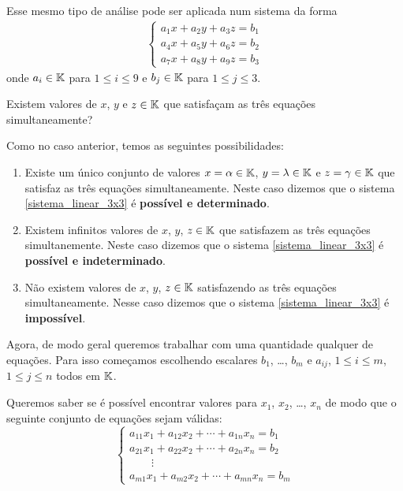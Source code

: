 Esse mesmo tipo de análise pode ser aplicada num sistema da forma
\begin{align}
    \begin{cases}\label{sistema_linear_3x3}
        a_1x + a_2y + a_3z = b_1\\
        a_4x + a_5y + a_6z = b_2\\
        a_7x + a_8y + a_9z = b_3
    \end{cases}
\end{align}
onde $a_i \in \mathbb{K}$ para $1 \le i \le 9$ e $b_j \in \mathbb{K}$ para $1 \le j \le 3$.

\vspace{.3cm}

Existem valores de $x$, $y$ e $z \in \mathbb{K}$ que satisfaçam as três equações simultaneamente?

Como no caso anterior, temos as seguintes possibilidades:
\begin{enumerate}[label={\roman*})]
    \item Existe um único conjunto de valores $x = \alpha \in \mathbb{K}$, $y = \lambda \in \mathbb{K}$ e $z = \gamma \in \mathbb{K}$  que satisfaz as três equações simultaneamente.  Neste caso dizemos que o sistema \eqref{sistema_linear_3x3}  é \textbf{possível e determinado}.

    \item Existem infinitos valores de $x$, $y$, $z \in \mathbb{K}$  que satisfazem as três equações simultanemente.  Neste caso dizemos que o sistema \eqref{sistema_linear_3x3}  é \textbf{possível e indeterminado}.

    \item Não existem valores de $x$, $y$, $z \in \mathbb{K}$  satisfazendo as três equações simultaneamente.  Nesse caso dizemos que o sistema \eqref{sistema_linear_3x3}  é \textbf{impossível}.
\end{enumerate}


Agora, de modo geral queremos trabalhar com uma quantidade qualquer de equações. Para isso começamos escolhendo escalares $b_1$, \dots, $b_m$  e $a_{ij}$,  $1 \le i \le m$, $1 \le j \le n$ todos em $\mathbb{K}$.

Queremos saber se é possível encontrar valores para  $x_1$, $x_2$, \dots, $x_n$  de modo que o seguinte conjunto de equações sejam válidas: 
\begin{equation}\label{sistema_linear_geral}
\begin{cases}
        a_{11}x_1 + a_{12}x_2 + \cdots + a_{1n}x_n = b_1\\
        a_{21}x_1 + a_{22}x_2 + \cdots + a_{2n}x_n = b_2\\
        \qquad \vdots\\
        a_{m1}x_1 + a_{m2}x_2 + \cdots + a_{mn}x_n = b_m
    \end{cases}
\end{equation}

